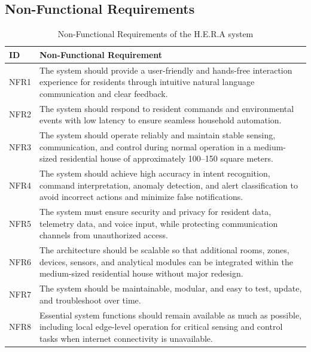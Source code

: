 \FloatBarrier

\subsection{Non-Functional Requirements}

\begin{table}[H]
	\centering
	\caption{Non-Functional Requirements of the H.E.R.A system}
	\label{tab:nonfunctional_requirements}
	\renewcommand{\arraystretch}{1.2}
	\small
	\begin{tabularx}{\textwidth}{|>{\centering\arraybackslash}p{1.2cm}|X|}
		\hline
		\textbf{ID} & \textbf{Non-Functional Requirement} \\
		\hline \hline
		NFR1 & The system should provide a user-friendly and hands-free interaction experience for residents through intuitive natural language communication and clear feedback. \\
		\hline
		NFR2 & The system should respond to resident commands and environmental events with low latency to ensure seamless household automation. \\
		\hline
		NFR3 & The system should operate reliably and maintain stable sensing, communication, and control during normal operation in a medium-sized residential house of approximately 100--150 square meters. \\
		\hline
		NFR4 & The system should achieve high accuracy in intent recognition, command interpretation, anomaly detection, and alert classification to avoid incorrect actions and minimize false notifications. \\
		\hline
		NFR5 & The system must ensure security and privacy for resident data, telemetry data, and voice input, while protecting communication channels from unauthorized access. \\
		\hline
		NFR6 & The architecture should be scalable so that additional rooms, zones, devices, sensors, and analytical modules can be integrated within the medium-sized residential house without major redesign. \\
		\hline
		NFR7 & The system should be maintainable, modular, and easy to test, update, and troubleshoot over time. \\
		\hline
		NFR8 & Essential system functions should remain available as much as possible, including local edge-level operation for critical sensing and control tasks when internet connectivity is unavailable. \\
		\hline
	\end{tabularx}
\end{table}

